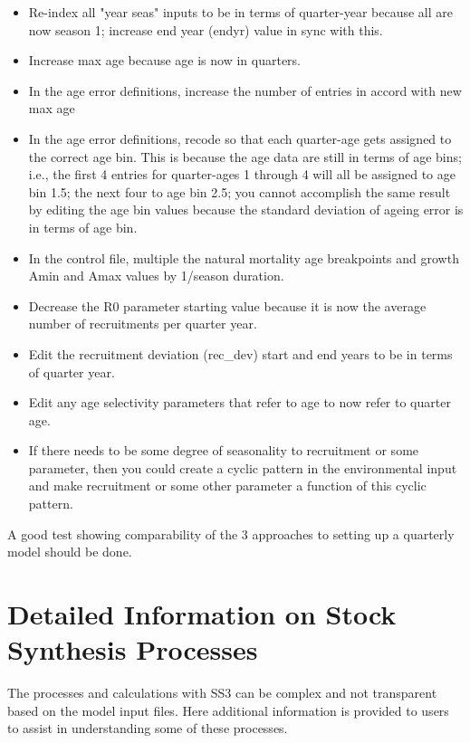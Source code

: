 \begin{itemize}
	\item Re-index all "year seas" inputs to be in terms of quarter-year because all are now season 1; increase end year (endyr) value in sync with this.
	\item Increase max age because age is now in quarters.
	\item In the age error definitions, increase the number of entries in accord with new max age
	\item In the age error definitions, recode so that each quarter-age gets assigned to the correct age bin. This is because the age data are still in terms of age bins; i.e., the first 4 entries for quarter-ages 1 through 4 will all be assigned to age bin 1.5; the next four to age bin 2.5;  you cannot accomplish the same result by editing the age bin values because the standard deviation of ageing error is in terms of age bin.
	\item In the control file, multiple the natural mortality age breakpoints and growth Amin and Amax values by 1/season duration.
	\item Decrease the R0 parameter starting value because it is now the average number of recruitments per quarter year.
	\item Edit the recruitment deviation (rec\_dev) start and end years to be in terms of quarter year.
	\item Edit any age selectivity parameters that refer to age to now refer to quarter age.
	\item If there needs to be some degree of seasonality to recruitment or some parameter, then you could create a cyclic pattern in the environmental input and make recruitment or some other parameter a function of this cyclic pattern.
\end{itemize}

A good test showing comparability of the 3 approaches to setting up a quarterly model should be done.

\pagebreak


\section{Detailed Information on Stock Synthesis Processes}

The processes and calculations with SS3 can be complex and not transparent based on the model input files. Here additional information is provided to users to assist in understanding some of these processes.


